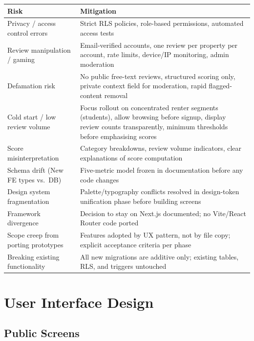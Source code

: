 \documentclass[11pt,letterpaper]{article}
\begin{document}
\begin{longtable}{p{5cm} p{8.5cm}}
\toprule
\textbf{Risk} & \textbf{Mitigation} \\
\midrule
\endhead
Privacy / access control errors &
Strict RLS policies, role-based permissions, automated access tests \\
\addlinespace
Review manipulation / gaming &
Email-verified accounts, one review per property per account, rate limits, device/IP monitoring, admin moderation \\
\addlinespace
Defamation risk &
No public free-text reviews, structured scoring only, private context field for moderation, rapid flagged-content removal \\
\addlinespace
Cold start / low review volume &
Focus rollout on concentrated renter segments (students), allow browsing before signup, display review counts transparently, minimum thresholds before emphasising scores \\
\addlinespace
Score misinterpretation &
Category breakdowns, review volume indicators, clear explanations of score computation \\
\addlinespace
Schema drift (New FE types vs.\ DB) &
Five-metric model frozen in documentation before any code changes \\
\addlinespace
Design system fragmentation &
Palette/typography conflicts resolved in design-token unification phase before building screens \\
\addlinespace
Framework divergence &
Decision to stay on Next.js documented; no Vite/React Router code ported \\
\addlinespace
Scope creep from porting prototypes &
Features adopted by UX pattern, not by file copy; explicit acceptance criteria per phase \\
\addlinespace
Breaking existing functionality &
All new migrations are additive only; existing tables, RLS, and triggers untouched \\
\bottomrule
\end{longtable}

\section{User Interface Design}

\subsection{Public Screens}
\end{document}
